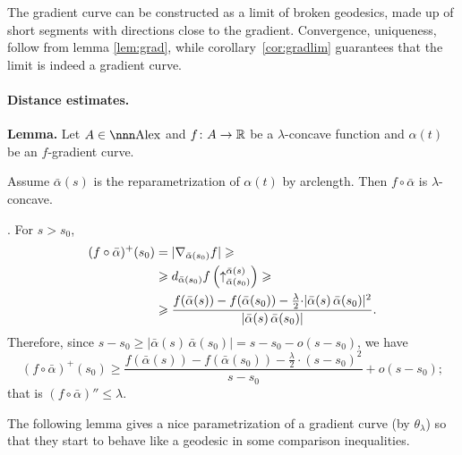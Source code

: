 \documentclass{article}
\begin{document}
\label{grad-constr} The gradient curve  can be constructed as a limit of broken
geodesics,
made up of short segments with directions close to the gradient. 
Convergence, uniqueness,
follow from lemma \ref{lem:grad}, while corollary~\ref{cor:gradlim} guarantees
that the limit is indeed
a gradient curve.

\paragraph*{Distance estimates.}

\begin{thm}{\bf Lemma.} 
\label{lem:concave}
Let $A\in\Alex$ and $f\colon A\to \mathbb{R}$ be a
$\lambda$-concave function and $\alpha(t)$ be an $f$-gradient curve.

Assume $\bar\alpha(s)$ is the reparametrization of $\alpha(t)$ by arclength. 
Then $f\circ\bar\alpha$ is  $\lambda$-concave.
\end{thm} 

\Proof. For $s>s_0$,
\begin{align*}
(f\circ\bar\alpha)^+(s_0)
&=
|\nabla_{\bar\alpha(s_0)}f|
\geqslant
\\
&\geqslant
d_{\bar\alpha(s_0)}f\left(\uparrow_{\bar\alpha(s_0)}^{\bar\alpha(s)}\right)
\geqslant
\\
&\geqslant
\frac{f(\bar\alpha(s))-f(\bar\alpha(s_0))-\tfrac\lambda2{\cdot}
|\bar\alpha(s)\,\bar\alpha(s_0)|^2 }{|\bar\alpha(s)\,\bar\alpha(s_0)|}.
\end{align*}
Therefore, since $s-s_0\ge|\bar\alpha(s)\,\bar\alpha(s_0)|=s-s_0-o(s-s_0)$, we
have 
$$(f\circ\bar\alpha)^+(s_0)\ge
\frac{f(\bar\alpha(s))-f(\bar\alpha(s_0))-\tfrac\lambda2{\cdot}(s-s_0)^2}{s-s_0} +o(s-s_0);$$
that is $(f\circ\bar\alpha)''\le\lambda$.
\qeds  

The following lemma gives a nice parametrization of a gradient
curve (by $\theta_\lambda$) 
so that they start to behave like a geodesic in some comparison inequalities.
\end{document}
